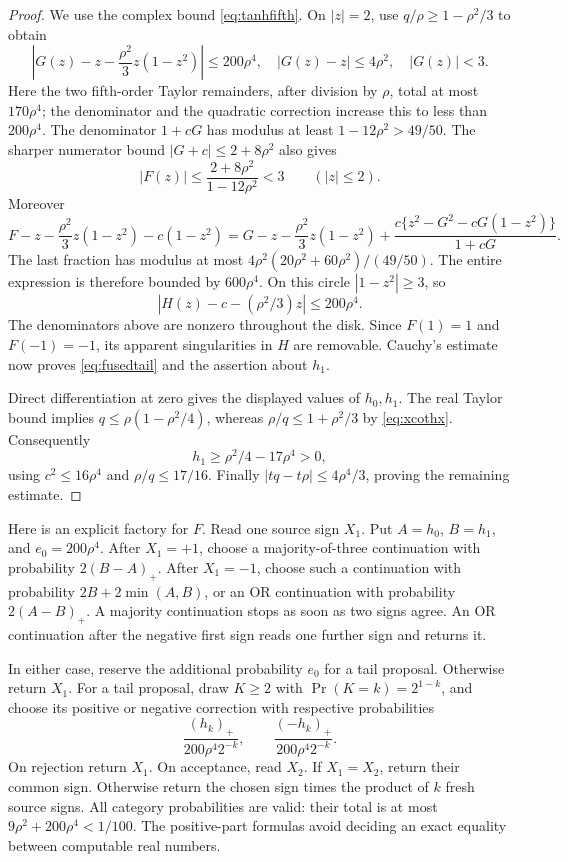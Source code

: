 \begin{proof}
We use the complex bound \eqref{eq:tanhfifth}.
On \(|z|=2\), use \(q/\rho\ge1-\rho^2/3\) to obtain
\[
 \left|G(z)-z-\frac{\rho^2}3z(1-z^2)\right|
 \le200\rho^4,\quad |G(z)-z|\le4\rho^2,\quad |G(z)|<3.
\]
Here the two fifth-order Taylor remainders, after division by
\(\rho\), total at most \(170\rho^4\); the denominator and
the quadratic correction increase this to less than
\(200\rho^4\).  The denominator \(1+cG\) has modulus at
least \(1-12\rho^2>49/50\). The sharper numerator bound
\(|G+c|\le2+8\rho^2\) also gives
\[
 |F(z)|\le\frac{2+8\rho^2}{1-12\rho^2}<3
 \qquad(|z|\le2).
\]
Moreover
\[
 F-z-\frac{\rho^2}3z(1-z^2)-c(1-z^2)
 =G-z-\frac{\rho^2}3z(1-z^2)
 +\frac{c\{z^2-G^2-cG(1-z^2)\}}{1+cG}.
\]
The last fraction has modulus at most
\(4\rho^2(20\rho^2+60\rho^2)/(49/50)\).
The entire expression is therefore bounded by \(600\rho^4\).
On this circle \(|1-z^2|\ge3\), so
\begin{equation}\label{eq:fusedHbound}
 |H(z)-c-(\rho^2/3)z|\le200\rho^4.
\end{equation}
The denominators above are nonzero throughout the disk.  Since
\(F(1)=1\) and \(F(-1)=-1\), its apparent singularities in
\(H\) are removable.  Cauchy's estimate now proves
\eqref{eq:fusedtail} and the assertion about \(h_1\).

Direct differentiation at zero gives the displayed values of
\(h_0,h_1\).  The real Taylor bound implies
\(q\le\rho(1-\rho^2/4)\), whereas
\(\rho/q\le1+\rho^2/3\) by \eqref{eq:xcothx}. Consequently
\[
 h_1\ge\rho^2/4-17\rho^4>0,
\]
using \(c^2\le16\rho^4\) and \(\rho/q\le17/16\).
Finally \(|tq-t\rho|\le4\rho^4/3\), proving the remaining
estimate.
\end{proof}

Here is an explicit factory for \(F\).  Read one source sign
\(X_1\).  Put \(A=h_0\), \(B=h_1\), and \(e_0=200\rho^4\).
After \(X_1=+1\), choose a majority-of-three continuation with
probability \(2(B-A)_+\).  After \(X_1=-1\), choose such a
continuation with probability \(2B+2\min(A,B)\), or an OR
continuation with probability \(2(A-B)_+\).  A majority
continuation stops as soon as two signs agree.  An OR continuation
after the negative first sign reads one further sign and returns it.

In either case, reserve the additional probability \(e_0\) for a
tail proposal.  Otherwise return \(X_1\).  For a tail proposal,
draw \(K\ge2\) with \(\Pr(K=k)=2^{1-k}\), and choose its
positive or negative correction with respective probabilities
\[
 \frac{(h_k)_+}{200\rho^4 2^{-k}},\qquad
 \frac{(-h_k)_+}{200\rho^4 2^{-k}}.
\]
On rejection return \(X_1\).  On acceptance, read \(X_2\).
If \(X_1=X_2\), return their common sign.  Otherwise return
the chosen sign times the product of \(k\) fresh source signs.
All category probabilities are valid: their total is at most
\(9\rho^2+200\rho^4<1/100\).  The positive-part formulas
avoid deciding an exact equality between computable real numbers.

